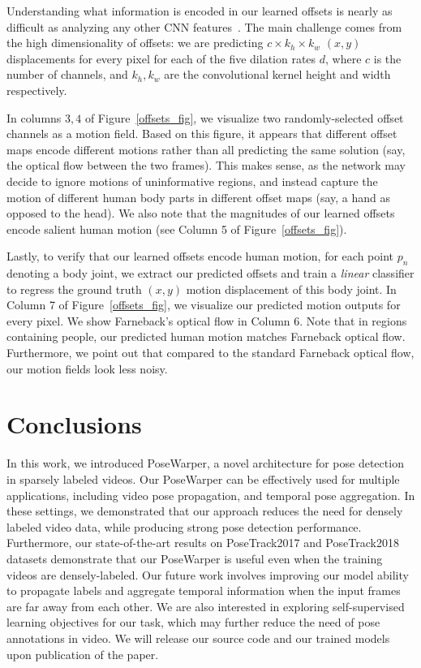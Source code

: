 \documentclass{article}
\begin{document}
Understanding what information is encoded in our learned offsets is nearly as difficult as analyzing any other CNN features~\cite{journals/corr/ZeilerF13, journals/corr/YosinskiCNFL15}. The main challenge comes from the high dimensionality of offsets: we are predicting $c \times k_h \times k_w$  $(x,y)$ displacements for every pixel for each of the five dilation rates $d$, where $c$ is the number of channels, and $k_h, k_w$ are the convolutional kernel height and width respectively. 




In columns $3,4$ of Figure~\ref{offsets_fig}, we visualize two randomly-selected offset channels as a motion field. Based on this figure, it appears that different offset maps encode different motions rather than all predicting the same solution (say, the optical flow between the two frames). This makes sense, as the network may decide to ignore motions of uninformative regions, and instead capture the motion of different human body parts in different offset maps (say, a hand as opposed to the head). We also note that the magnitudes of our learned offsets encode salient human motion (see Column 5 of Figure~\ref{offsets_fig}). 



Lastly, to verify that our learned offsets encode human motion, for each point $p_n$ denoting a body joint, we extract our predicted offsets and train a {\em linear} classifier to regress the ground truth $(x,y)$ motion displacement of this body joint. In Column 7 of Figure~\ref{offsets_fig}, we visualize our predicted motion outputs for every pixel. We show Farneback's optical flow in Column 6. Note that in regions containing people, our predicted human motion matches Farneback optical flow. Furthermore, we point out that compared to the standard Farneback optical flow, our motion fields look less noisy.






\section{Conclusions}

In this work, we introduced PoseWarper, a novel architecture for pose detection in sparsely labeled videos. Our PoseWarper can be effectively used for multiple applications, including video pose propagation, and temporal pose aggregation. In these settings, we demonstrated that our approach reduces the need for densely labeled video data, while producing strong pose detection performance. Furthermore, our state-of-the-art results on PoseTrack2017 and PoseTrack2018 datasets demonstrate that our PoseWarper is useful even when the training videos are densely-labeled. Our future work involves improving our model ability to propagate labels and aggregate temporal information when the input frames are far away from each other. We are also interested in exploring self-supervised learning objectives for our task, which may further reduce the need of pose annotations in video. We will release our source code and our trained models upon publication of the paper.
\end{document}
